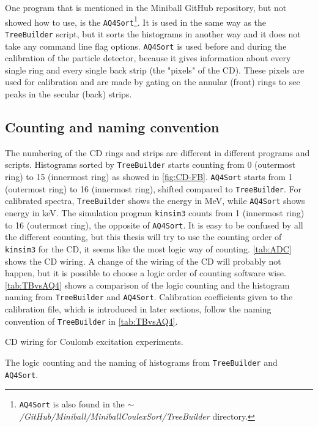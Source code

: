 \documentclass[twoside,english]{uiofysmaster/uiofysmaster}
\let\orgautoref\autoref
\renewcommand{\autoref}
        {%
		 \def\subsectionautorefname{Section}%
		 \def\subsubsectionautorefname{Section}%
          \orgautoref}
\begin{document}
One program that is mentioned in the Miniball GitHub repository, but not showed how to use, is the \texttt{AQ4Sort}\footnote{\texttt{AQ4Sort} is also found in the \textit{$\sim$/GitHub/Miniball/MiniballCoulexSort/TreeBuilder} directory.}. 
It is used in the same way as the \texttt{TreeBuilder} script, but it sorts the histograms in another way and it does not take any command line flag options. 
\texttt{AQ4Sort} is used before and during the calibration of the particle detector, because it gives information about every single ring and every single back strip (the "pixels" of the CD). 
These pixels are used for calibration and are made by gating on the annular (front) rings to see peaks in the secular (back) strips. 


\subsection{Counting and naming convention}
The numbering of the CD rings and strips are different in different programs and scripts. 
Histograms sorted by \texttt{TreeBuilder} starts counting from 0 (outermost ring) to 15 (innermost ring) as showed in \autoref{fig:CD-FB}. 
\texttt{AQ4Sort} starts from 1 (outermost ring) to 16 (innermost ring), shifted compared to \texttt{TreeBuilder}.
For calibrated spectra, \texttt{TreeBuilder} shows the energy in MeV, while \texttt{AQ4Sort} shows energy in keV.
The simulation program \texttt{kinsim3} counts from 1 (innermost ring) to 16 (outermost ring), the opposite of \texttt{AQ4Sort}. 
It is easy to be confused by all the different counting, but this thesis will try to use the counting order of \texttt{kinsim3} for the CD, it seems like the most logic way of counting. 
\autoref{tab:ADC} shows the CD wiring.
A change of the wiring of the CD will probably not happen, but it is possible to choose a logic order of counting software wise.
\autoref{tab:TBvsAQ4} shows a comparison of the logic counting and the histogram naming from \texttt{TreeBuilder} and \texttt{AQ4Sort}.
Calibration coefficients given to the calibration file, which is introduced in later sections, follow the naming convention of \texttt{TreeBuilder} in \autoref{tab:TBvsAQ4}.


\begin{table}[ht] 
	\centering 
	\caption{CD wiring for Coulomb excitation experiments.}
	
	\label{tab:ADC}
\end{table}


\begin{table}[ht] 
	\centering 
	\caption{The logic counting and the naming of histograms from \texttt{TreeBuilder} and \texttt{AQ4Sort}.}
	
	\label{tab:TBvsAQ4}
\end{table}
\end{document}
